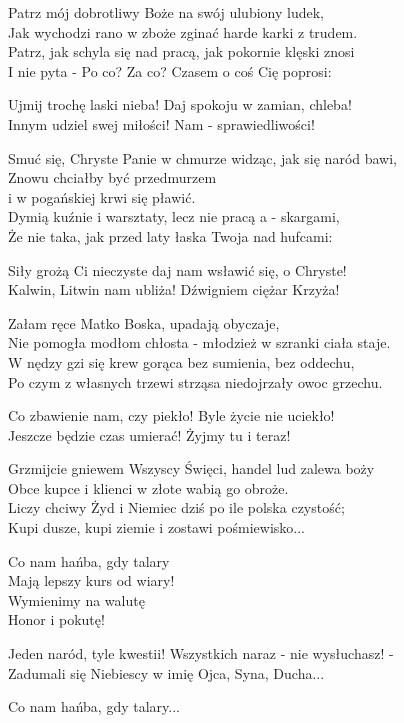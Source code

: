 \begin{text}
\footnotesize{
    \hfill\break
    Patrz mój dobrotliwy Boże na swój ulubiony ludek,\\
    Jak wychodzi rano w zboże zginać harde karki z trudem.\\
    Patrz, jak schyla się nad pracą, jak pokornie klęski znosi\\
    I nie pyta - Po co? Za co? Czasem o coś Cię poprosi:

    Ujmij trochę laski nieba! Daj spokoju w zamian, chleba!\\
    Innym udziel swej miłości! Nam - sprawiedliwości!

    Smuć się, Chryste Panie w chmurze widząc, jak się naród bawi,\\
    Znowu chciałby być przedmurzem\\
	i w pogańskiej krwi się pławić.\\
    Dymią kuźnie i warsztaty, lecz nie pracą a - skargami,\\
    Że nie taka, jak przed laty łaska Twoja nad hufcami:

    Siły grożą Ci nieczyste daj nam wsławić się, o Chryste!\\
    Kalwin, Litwin nam ubliża! Dźwigniem ciężar Krzyża!
 
    Załam ręce Matko Boska, upadają obyczaje,\\
    Nie pomogła modłom chłosta - młodzież w szranki ciała staje.\\
    W nędzy gzi się krew gorąca bez sumienia, bez oddechu,\\
    Po czym z własnych trzewi strząsa niedojrzały owoc grzechu.

    Co zbawienie nam, czy piekło! Byle życie nie uciekło!\\
    Jeszcze będzie czas umierać! Żyjmy tu i teraz!

    Grzmijcie gniewem Wszyscy Święci, handel lud zalewa boży\\
    Obce kupce i klienci w złote wabią go obroże.\\
    Liczy chciwy Żyd i Niemiec dziś po ile polska czystość;\\
    Kupi dusze, kupi ziemie i zostawi pośmiewisko...

    Co nam hańba, gdy talary\\
    Mają lepszy kurs od wiary!\\
    Wymienimy na walutę\\
    Honor i pokutę!

    Jeden naród, tyle kwestii! Wszystkich naraz - nie wysłuchasz! -\\
    Zadumali się Niebiescy w imię Ojca, Syna, Ducha...

    Co nam hańba, gdy talary...
}
\end{text}
